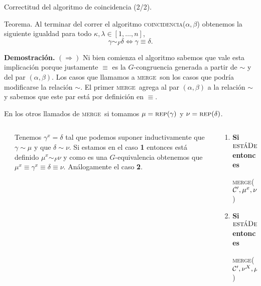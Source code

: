 \documentclass[aspectratio=169, 9pt]{beamer}
\newcommand{\rep}{\textsc{rep}}
\newcommand{\coin}{\textsc{coincidencia}}
\newcommand{\mer}{\textsc{merge}}
\newcommand{\edeff}{\textsc{estáDefinido}}
\newcommand{\Co}{{\cal{C}}}
\begin{document}
\begin{frame}[fragile]{Correctitud del algoritmo de coincidencia (2/2).}
	\begin{alertblock}{Teorema.}
		Al terminar del correr el algoritmo \coin($\alpha, \beta$) obtenemos la siguiente igualdad para todo $\kappa, \lambda \in [1,\dots,n]$,
		\begin{equation*}
			\gamma \sim_F \delta \iff \gamma \equiv \delta.
		\end{equation*}
	\end{alertblock}
	\pause 
	
	\textbf{Demostración.} $(\Rightarrow)$
	\pause
	Ni bien comienza el algoritmo sabemos que vale esta implicación porque justamente $\equiv$ es la $G$-congruencia generada a partir de $\sim$ y del par $(\alpha, \beta)$.
	\pause
	Los casos que llamamos a \mer \ son los casos que podría modificarse la relación $\sim$.
	El primer \mer \ agrega al par $(\alpha, \beta)$ a la relación $\sim$ y sabemos que este par está por definición en $\equiv$.
	\pause
	
	
	En los otros llamados de \mer \ si tomamos $\mu = \rep(\gamma) $ y $\nu = \rep(\delta)$.
	\medskip
	\pause
	\begin{columns}
		\begin{column}{0.1\textwidth}
			
		\end{column}
		\begin{column}{0.6\textwidth}
			\begin{center}
				{ Tenemos $\gamma^x = \delta$ tal que podemos suponer inductivamente que $\gamma \sim \mu$ y que $\delta \sim \nu $.
				Si estamos en el caso \textbf{1} entonces está definido $\mu^x \sim_F \nu$ y como es una $G$-equivalencia obtenemos que $\mu^x \equiv \gamma^x \equiv \delta \equiv \nu$. 
				Análogamente el caso \textbf{2}.}
			\end{center} 	
		\end{column}
		\begin{column}{0.3\textwidth}
			{\small \begin{enumerate}
				\item  \textbf{Si} $\edeff(\Co', \mu, x)$ \textbf{entonces}
				
				\mer($\Co', \mu^x, \nu, q$) 
				\item  \textbf{Si} $\edeff(\Co', \nu, X)$  \textbf{entonces}
				
				\mer($\Co', \nu^X, \mu, q$)
			\end{enumerate}}
		\end{column}
	\end{columns}
\end{frame}
\end{document}
